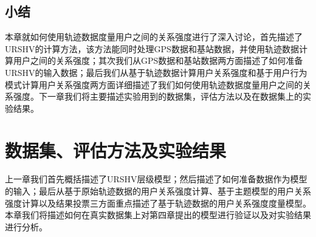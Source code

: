 \section{小结}
\label{sec:section4-4}
本章就如何使用轨迹数据度量用户之间的关系强度进行了深入讨论，首先描述了URSHV的计算方法，该方法能同时处理GPS数据和基站数据，并使用轨迹数据计算用户之间的关系强度；其次我们从GPS数据和基站数据两方面描述了如何准备URSHV的输入数据；最后我们从基于轨迹数据计算用户关系强度和基于用户行为模式计算用户关系强度两方面详细描述了我们如何使用轨迹数据度量用户之间的关系强度。下一章我们将主要描述实验用到的数据集，评估方法以及在数据集上的实验结果。
\chapter{数据集、评估方法及实验结果}
\label{chap:chapter03}
上一章我们首先概括描述了URSHV层级模型；然后描述了如何准备数据作为模型的输入；最后从基于原始轨迹数据的用户关系强度计算、基于主题模型的用户关系强度计算以及结果投票三方面重点描述了基于轨迹数据的用户关系强度度量模型。本章我们将描述如何在真实数据集上对第四章提出的模型进行验证以及对实验结果进行分析。
